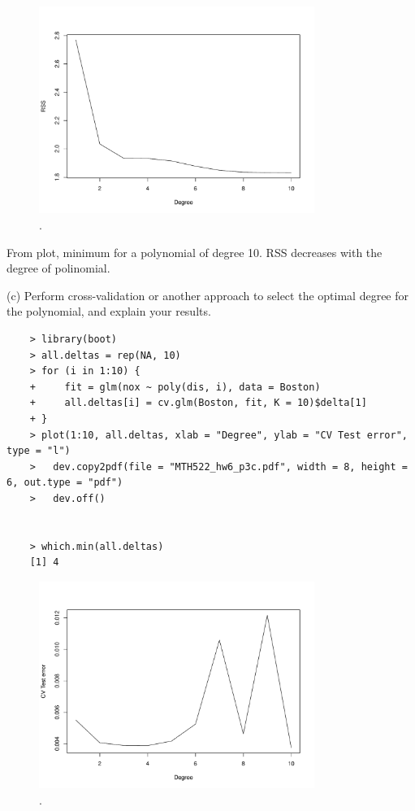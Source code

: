 \documentclass{article}
\begin{document}
\begin{figure}[htb]
	\begin{center}
		\includegraphics[width=0.8\textwidth]{MTH522_hw6_p3b.pdf}
	\end{center}
	\caption{.}
	\label{fig:MTH522_hw6_p3b}
\end{figure}

From plot, minimum for a polynomial of degree 10. RSS decreases with the degree of polinomial.

\newpage

(c) Perform cross-validation or another approach to select the optimal degree for the polynomial, and explain your results.\\

\begin{program}
	\begin{verbatim}
	> library(boot)
	> all.deltas = rep(NA, 10)
	> for (i in 1:10) {
	+     fit = glm(nox ~ poly(dis, i), data = Boston)
	+     all.deltas[i] = cv.glm(Boston, fit, K = 10)$delta[1]
	+ }
	> plot(1:10, all.deltas, xlab = "Degree", ylab = "CV Test error", type = "l")
	> 	dev.copy2pdf(file = "MTH522_hw6_p3c.pdf", width = 8, height = 6, out.type = "pdf")
	> 	dev.off()


	> which.min(all.deltas)
	[1] 4
	\end{verbatim}
\end{program}


\begin{figure}[htb]
	\begin{center}
		\includegraphics[width=0.8\textwidth]{MTH522_hw6_p3c.pdf}
	\end{center}
	\caption{.}
	\label{fig:MTH522_hw6_p3c}
\end{figure}
\end{document}
